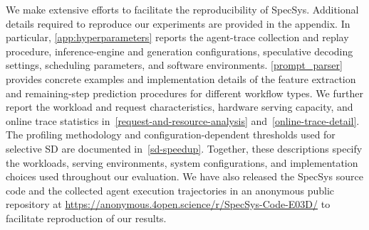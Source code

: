 We make extensive efforts to facilitate the reproducibility of SpecSys.  Additional details required to reproduce our experiments are provided in the appendix. In particular, \autoref{app:hyperparameters} reports the agent-trace collection and replay procedure, inference-engine and generation configurations, speculative decoding settings, scheduling parameters, and software environments. \autoref{prompt_parser} provides concrete examples and implementation details of the feature extraction and remaining-step prediction procedures for different workflow types. We further report the workload and request characteristics, hardware serving capacity, and online trace statistics in~\autoref{request-and-resource-analysis} and~\autoref{online-trace-detail}. The profiling methodology and configuration-dependent thresholds used for selective SD are documented in~\autoref{sd-speedup}. Together, these descriptions specify the workloads, serving environments, system configurations, and implementation choices used throughout our evaluation. We have also released the SpecSys source code and the collected agent execution trajectories in an anonymous public repository at \url{https://anonymous.4open.science/r/SpecSys-Code-E03D/} to facilitate reproduction of our results.





